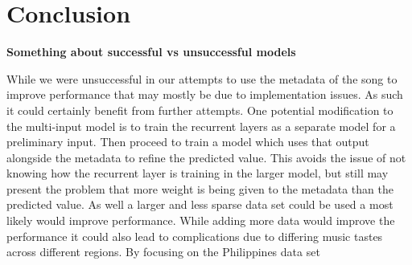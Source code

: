 \documentclass[11pt]{article}
\begin{document}
% 
% 
\section{Conclusion}
\textbf{Something about successful vs unsuccessful models}


While we were unsuccessful in our attempts to use the metadata of the song to improve performance that may mostly be due to implementation issues. As such it could certainly benefit from further attempts. One potential modification to the multi-input model is to train the recurrent layers as a separate model for a preliminary input. Then proceed to train a model which uses that output alongside the metadata to refine the predicted value. This avoids the issue of not knowing how the recurrent layer is training in the larger model, but still may present the problem that more weight is being given to the metadata than the predicted value. As well a larger and less sparse data set could be used a most likely would improve performance.
While adding more data would improve the performance it could also lead to complications due to differing music tastes across different regions. By focusing on the Philippines data set  


% 
\end{document}
